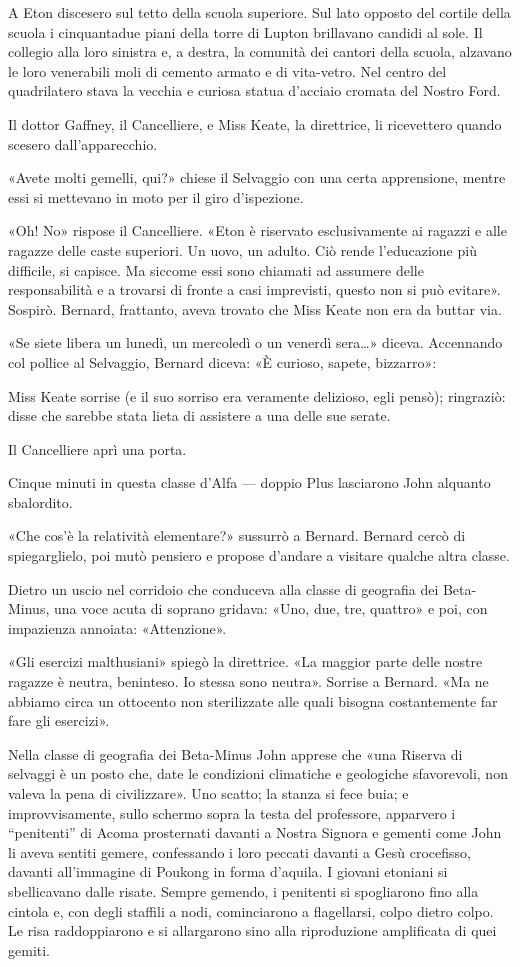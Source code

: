 \documentclass[
a5paper, %
10pt, %
twoside, 
onecolumn, %
openany, %
]{memoir}
\begin{document}
A Eton discesero sul tetto della scuola superiore. Sul lato opposto del cortile della scuola i cinquantadue piani della torre di Lupton brillavano candidi al sole. Il collegio alla loro sinistra e, a destra, la comunità dei cantori della scuola, alzavano le loro venerabili moli di cemento armato e di vita-vetro. Nel centro del quadrilatero stava la vecchia e curiosa statua d’acciaio cromata del Nostro Ford.

Il dottor Gaffney, il Cancelliere, e Miss Keate, la direttrice, li ricevettero quando scesero dall’apparecchio.

«Avete molti gemelli, qui?» chiese il Selvaggio con una certa apprensione, mentre essi si mettevano in moto per il giro d’ispezione.

«Oh! No» rispose il Cancelliere. «Eton è riservato esclusivamente ai ragazzi e alle ragazze delle caste superiori. Un uovo, un adulto. Ciò rende l’educazione più difficile, si capisce. Ma siccome essi sono chiamati ad assumere delle responsabilità e a trovarsi di fronte a casi imprevisti, questo non si può evitare». Sospirò. Bernard, frattanto, aveva trovato che Miss Keate non era da buttar via.

«Se siete libera un lunedì, un mercoledì o un venerdì sera…» diceva. Accennando col pollice al Selvaggio, Bernard diceva: «È curioso, sapete, bizzarro»:

Miss Keate sorrise (e il suo sorriso era veramente delizioso, egli pensò); ringraziò: disse che sarebbe stata lieta di assistere a una delle sue serate.

Il Cancelliere aprì una porta.

Cinque minuti in questa classe d’Alfa — doppio Plus lasciarono John alquanto sbalordito.

«Che cos’è la relatività elementare?» sussurrò a Bernard. Bernard cercò di spiegarglielo, poi mutò pensiero e propose d’andare a visitare qualche altra classe.

Dietro un uscio nel corridoio che conduceva alla classe di geografia dei Beta-Minus, una voce acuta di soprano gridava: «Uno, due, tre, quattro» e poi, con impazienza annoiata: «Attenzione».

«Gli esercizi malthusiani» spiegò la direttrice. «La maggior parte delle nostre ragazze è neutra, beninteso. Io stessa sono neutra». Sorrise a Bernard. «Ma ne abbiamo circa un ottocento non sterilizzate alle quali bisogna costantemente far fare gli esercizi».

Nella classe di geografia dei Beta-Minus John apprese che «una Riserva di selvaggi è un posto che, date le condizioni climatiche e geologiche sfavorevoli, non valeva la pena di civilizzare». Uno scatto; la stanza si fece buia; e improvvisamente, sullo schermo sopra la testa del professore, apparvero i “penitenti” di Acoma prosternati davanti a Nostra Signora e gementi come John li aveva sentiti gemere, confessando i loro peccati davanti a Gesù crocefisso, davanti all’immagine di Poukong in forma d’aquila. I giovani etoniani si sbellicavano dalle risate. Sempre gemendo, i penitenti si spogliarono fino alla cintola e, con degli staffili a nodi, cominciarono a flagellarsi, colpo dietro colpo. Le risa raddoppiarono e si allargarono sino alla riproduzione amplificata di quei gemiti.
\end{document}
